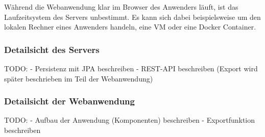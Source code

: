 Während die Webanwendung klar im Browser des Anwenders läuft, ist das Laufzeitsystem des Servers unbestimmt.
Es kann sich dabei beispielsweise um den lokalen Rechner eines Anwenders handeln, eine VM oder eine Docker Container.

\subsubsection{Detailsicht des Servers}
\label{subsubsec:detail-server}

TODO:
- Persistenz mit JPA beschreiben
- REST-API beschreiben (Export wird später beschrieben im Teil der Webanwendung)

\subsubsection{Detailsicht der Webanwendung}
\label{subsubsec:detail-webapp}

TODO:
- Aufbau der Anwendung (Komponenten) beschreiben
- Exportfunktion beschreiben
